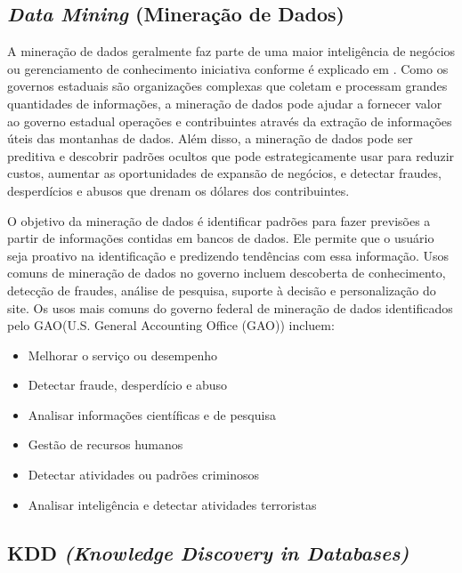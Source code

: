\subsection{\emph{Data Mining} (Mineração de Dados)}

\par A mineração de dados geralmente faz parte de uma maior inteligência de negócios ou gerenciamento de conhecimento
iniciativa conforme é explicado em \cite{dig2004privacy}. Como os governos estaduais são organizações complexas que coletam e processam grandes quantidades de informações, a mineração de dados pode ajudar a fornecer valor ao governo estadual operações e contribuintes através da extração de informações úteis das montanhas de
dados. Além disso, a mineração de dados pode ser preditiva e descobrir padrões ocultos que
pode estrategicamente usar para reduzir custos, aumentar as oportunidades de expansão de negócios, e detectar fraudes, desperdícios e abusos que drenam os dólares dos contribuintes.
\par O objetivo da mineração de dados é identificar padrões para fazer previsões a partir de
informações contidas em bancos de dados. Ele permite que o usuário seja proativo na identificação e predizendo tendências com essa informação. Usos comuns de mineração de dados no governo incluem descoberta de conhecimento, detecção de fraudes, análise de pesquisa, suporte à decisão e personalização do site. Os usos mais comuns do governo federal de mineração de dados
identificados pelo GAO(U.S. General Accounting Office (GAO)) incluem:
\begin{itemize}
\item Melhorar o serviço ou desempenho
\item Detectar fraude, desperdício e abuso
\item Analisar informações científicas e de pesquisa
\item Gestão de recursos humanos
\item Detectar atividades ou padrões criminosos
\item Analisar inteligência e detectar atividades terroristas
\end{itemize}

\subsection{KDD \emph{(Knowledge Discovery in Databases)}}

